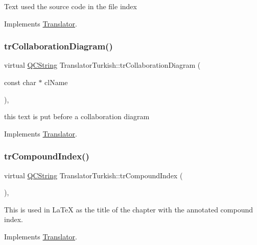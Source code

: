Text used the source code in the file index 

Implements \mbox{\hyperlink{class_translator}{Translator}}.

\mbox{\label{class_translator_turkish_afcbdc0699de84b9392b5e3bcb2cdd80e}} 
\subsubsection{\texorpdfstring{trCollaborationDiagram()}{trCollaborationDiagram()}}
{\footnotesize\ttfamily virtual \mbox{\hyperlink{class_q_c_string}{Q\+C\+String}} Translator\+Turkish\+::tr\+Collaboration\+Diagram (\begin{DoxyParamCaption}\item[{const char $\ast$}]{cl\+Name }\end{DoxyParamCaption})\hspace{0.3cm}{\ttfamily [inline]}, {\ttfamily [virtual]}}

this text is put before a collaboration diagram 

Implements \mbox{\hyperlink{class_translator}{Translator}}.

\mbox{\label{class_translator_turkish_a5532e87ed6b2ce5e0eec4f145fc65f98}} 
\subsubsection{\texorpdfstring{trCompoundIndex()}{trCompoundIndex()}}
{\footnotesize\ttfamily virtual \mbox{\hyperlink{class_q_c_string}{Q\+C\+String}} Translator\+Turkish\+::tr\+Compound\+Index (\begin{DoxyParamCaption}{ }\end{DoxyParamCaption})\hspace{0.3cm}{\ttfamily [inline]}, {\ttfamily [virtual]}}

This is used in La\+TeX as the title of the chapter with the annotated compound index. 

Implements \mbox{\hyperlink{class_translator}{Translator}}.

\mbox{\label{class_translator_turkish_a1f4bd6da3eafdbd578bac1b7117bda6a}} 
